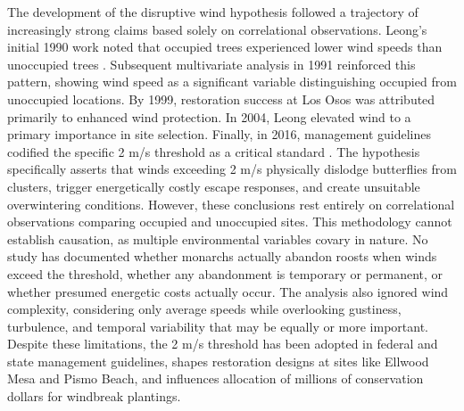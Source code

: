 The development of the disruptive wind hypothesis followed a trajectory of increasingly strong claims based solely on correlational observations. Leong's initial 1990 work noted that occupied trees experienced lower wind speeds than unoccupied trees \citep{leongMicroenvironmentalFactorsAssociated1990a}. Subsequent multivariate analysis in 1991 reinforced this pattern, showing wind speed as a significant variable distinguishing occupied from unoccupied locations. By 1999, restoration success at Los Osos was attributed primarily to enhanced wind protection. In 2004, Leong elevated wind to a primary importance in site selection. Finally, in 2016, management guidelines codified the specific 2 m/s threshold as a critical standard \citep{leongEvaluationManagementCalifornia2016}. The hypothesis specifically asserts that winds exceeding 2 m/s physically dislodge butterflies from clusters, trigger energetically costly escape responses, and create unsuitable overwintering conditions. However, these conclusions rest entirely on correlational observations comparing occupied and unoccupied sites. This methodology cannot establish causation, as multiple environmental variables covary in nature. No study has documented whether monarchs actually abandon roosts when winds exceed the threshold, whether any abandonment is temporary or permanent, or whether presumed energetic costs actually occur. The analysis also ignored wind complexity, considering only average speeds while overlooking gustiness, turbulence, and temporal variability that may be equally or more important. Despite these limitations, the 2 m/s threshold has been adopted in federal and state management guidelines, shapes restoration designs at sites like Ellwood Mesa and Pismo Beach, and influences allocation of millions of conservation dollars for windbreak plantings.


